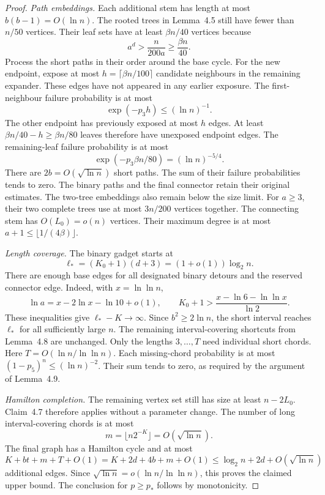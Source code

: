 \begin{proof}
\emph{Path embeddings.}
Each additional stem has length at most $b(b-1)=O(\ln n)$.
The rooted trees in Lemma~4.5 still have fewer than $n/50$ vertices.
Their leaf sets have at least $\beta n/40$ vertices because
\[
 a^d>\frac{n}{200a}\ge\frac{\beta n}{40}.
\]
Process the short paths in their order around the base cycle.
For the new endpoint, expose at most $h=\lceil\beta n/100\rceil$ candidate neighbours in the remaining expander.
These edges have not appeared in any earlier exposure.
The first-neighbour failure probability is at most
\[
 \exp(-p_3h)\le(\ln n)^{-1}.
\]
The other endpoint has previously exposed at most $h$ edges.
At least $\beta n/40-h\ge\beta n/80$ leaves therefore have unexposed endpoint edges.
The remaining-leaf failure probability is at most
\[
 \exp(-p_3\beta n/80)=(\ln n)^{-5/4}.
\]
There are $2b=O(\sqrt{\ln n})$ short paths.
The sum of their failure probabilities tends to zero.
The binary paths and the final connector retain their original estimates.
The two-tree embeddings also remain below the size limit.
For $a\ge3$, their two complete trees use at most $3n/200$ vertices together.
The connecting stem has $O(L_0)=o(n)$ vertices.
Their maximum degree is at most $a+1\le\lfloor1/(4\beta)\rfloor$.

\emph{Length coverage.}
The binary gadget starts at
\[
 \ell_*=(K_0+1)(d+3)=(1+o(1))\log_2 n.
\]
There are enough base edges for all designated binary detours and the reserved connector edge.
Indeed, with $x=\ln\ln n$,
\[
 \ln a=x-2\ln x-\ln10+o(1),\qquad
 K_0+1>\frac{x-\ln6-\ln\ln x}{\ln2}.
\]
These inequalities give $\ell_*-K\to\infty$.
Since $b^2\ge2\ln n$, the short interval reaches $\ell_*$ for all sufficiently large $n$.
The remaining interval-covering shortcuts from Lemma~4.8 are unchanged.
Only the lengths $3,\ldots,T$ need individual short chords.
Here $T=O(\ln n/\ln\ln n)$.
Each missing-chord probability is at most $(1-p_5)^n\le(\ln n)^{-2}$.
Their sum tends to zero, as required by the argument of Lemma~4.9.

\emph{Hamilton completion.}
The remaining vertex set still has size at least $n-2L_0$.
Claim~4.7 therefore applies without a parameter change.
The number of long interval-covering chords is at most
\[
 m=\lfloor n2^{-K}\rfloor=O(\sqrt{\ln n}).
\]
The final graph has a Hamilton cycle and at most
\[
 K+bt+m+T+O(1)
 =K+2d+4b+m+O(1)
 \le\log_2 n+2d+O(\sqrt{\ln n})
\]
additional edges.
Since $\sqrt{\ln n}=o(\ln n/\ln\ln n)$, this proves the claimed upper bound.
The conclusion for $p\ge p_*$ follows by monotonicity.
\end{proof}


